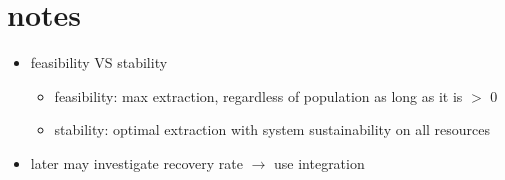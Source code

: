 \documentclass[a4paper,11pt]{article}
\begin{document}
    \section{notes}
    \begin{itemize}
        \item feasibility VS stability
        \begin{itemize}
            \item feasibility: max extraction, regardless of population as long as it is $>$ 0
            \item stability: optimal extraction with system sustainability on all resources
        \end{itemize}
        \item later may investigate recovery rate $\rightarrow$ use integration
    \end{itemize}
    
\end{document}
